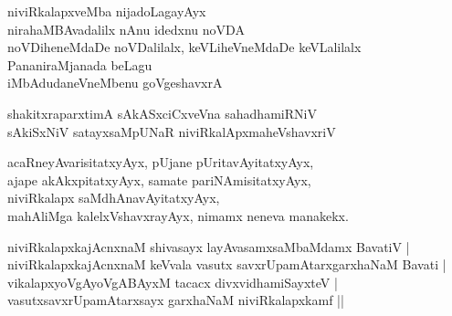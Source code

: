 \begin{entry}
\end{entry}

\begin{entry}
\begin{shl}
niviRkalapxveMba nijadoLagayAyx\\
nirahaMBAvadalilx nAnu idedxnu noVDA\\
noVDiheneMdaDe noVDalilalx, keVLiheVneMdaDe keVLalilalx\\
PananiraMjanada beLagu\\
iMbAdudaneVneMbenu goVgeshavxrA
\end{shl}
\begin{shl}
shakitxraparxtimA sAkASxciCxveVna sahadhamiRNiV\\
sAkiSxNiV satayxsaMpUNaR niviRkalApxmaheVshavxriV
\end{shl}
\begin{shl}
acaRneyAvarisitatxyAyx, pUjane pUritavAyitatxyAyx,\\
ajape akAkxpitatxyAyx, samate pariNAmisitatxyAyx,\\
niviRkalapx saMdhAnavAyitatxyAyx,\\
mahAliMga kalelxVshavxrayAyx, nimamx neneva manakekx.
\end{shl}
\end{entry}

\begin{entry}
\gl{}
\info{}{}{}{}
\begin{shl}
niviRkalapxkajAcnxnaM shivasayx layAvasamxsaMbaMdamx BavatiV |\\
niviRkalapxkajAcnxnaM keVvala vasutx savxrUpamAtarxgarxhaNaM Bavati |\\
vikalapxyoVgAyoVgABAyxM tacacx divxvidhamiSayxteV |\\
vasutxsavxrUpamAtarxsayx garxhaNaM niviRkalapxkamf ||
\end{shl}
\end{entry}

